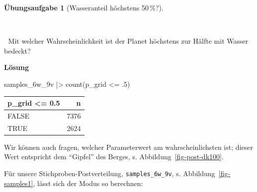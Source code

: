 \documentclass[
  ngerman,
  letterpaper,
  twoside,
  open=any]{scrbook}
\newenvironment{Shaded}{\begin{snugshade}}{\end{snugshade}}
\newcommand{\DecValTok}[1]{\textcolor[rgb]{0.68,0.00,0.00}{#1}}
\newcommand{\FunctionTok}[1]{\textcolor[rgb]{0.28,0.35,0.67}{#1}}
\newcommand{\NormalTok}[1]{\textcolor[rgb]{0.00,0.23,0.31}{#1}}
\newcommand{\SpecialCharTok}[1]{\textcolor[rgb]{0.37,0.37,0.37}{#1}}
\newcounter{none} %
\theoremstyle{definition}
\theoremstyle{plain}
\theoremstyle{definition}
\newtheorem{exercise}{Übungsaufgabe}[chapter]
\theoremstyle{definition}
\theoremstyle{definition}
\theoremstyle{definition}
\newtheorem{exercise}{Übungsaufgabe}[chapter]
\theoremstyle{remark}
\begin{document}
\begin{exercise}[Wasseranteil höchstens
50\,\%?]\protect\hypertarget{exr-wasser50}{}\label{exr-wasser50}

~

\begin{displayquote}
👩 Mit welcher Wahrscheinlichkeit ist der Planet höchstens zur Hälfte
mit Wasser bedeckt?
\end{displayquote}

\begin{tcolorbox}[enhanced jigsaw, arc=.35mm, bottomrule=.15mm, breakable, colback=white, colframe=quarto-callout-tip-color-frame, left=2mm, leftrule=.75mm, opacityback=0, rightrule=.15mm, toprule=.15mm]

\vspace{-3mm}\textbf{Lösung}\vspace{3mm}

\begin{Shaded}
\begin{Highlighting}[]
\NormalTok{samples\_6w\_9v }\SpecialCharTok{|\textgreater{}} \FunctionTok{count}\NormalTok{(p\_grid }\SpecialCharTok{\textless{}=}\NormalTok{ .}\DecValTok{5}\NormalTok{)}
\end{Highlighting}
\end{Shaded}

{\def\LTcaptype{none} %
\begin{longtable}[]{@{}lr@{}}
\toprule\noalign{}
p\_grid \textless= 0.5 & n \\
\midrule\noalign{}
\endhead
\bottomrule\noalign{}
\endlastfoot
FALSE & 7376 \\
TRUE & 2624 \\
\end{longtable}
}

\end{tcolorbox}

\end{exercise}

Wir können auch fragen, welcher Parameterwert am wahrscheinlichsten ist;
dieser Wert entspricht dem \enquote{Gipfel} des Berges, s.
Abbildung~\ref{fig-post-dk100}.

Für unsere Stichproben-Postverteilung, \texttt{samples\_6w\_9v}, s.
Abbildung~\ref{fig-samples1}, lässt sich der Modus so berechnen:

\begin{Shaded}
\end{Shaded}
\end{document}

